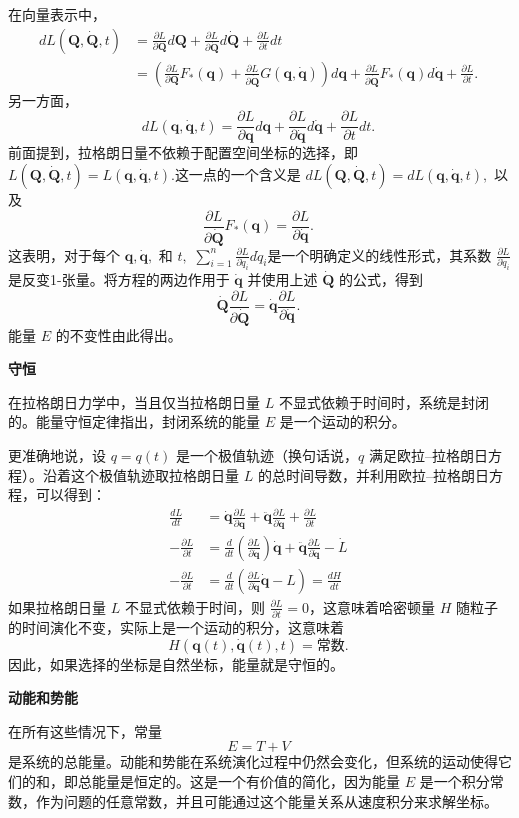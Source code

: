 在向量表示中，
\begin{equation}
\begin{aligned}
dL(\mathbf {Q}, {\dot {\mathbf {Q}}}, t) &= \frac{\partial L}{\partial \mathbf {Q}} d\mathbf {Q} + \frac{\partial L}{\partial {\dot {\mathbf {Q}}}} d{\dot {\mathbf {Q}}} + \frac{\partial L}{\partial t} dt\\
&= \left(\frac{\partial L}{\partial \mathbf {Q}} F_{*}(\mathbf {q}) + \frac{\partial L}{\partial {\dot {\mathbf {Q}}}} G(\mathbf {q}, {\dot {\mathbf {q}}})\right) d\mathbf {q} + \frac{\partial L}{\partial {\dot {\mathbf {Q}}}} F_{*}(\mathbf {q}) d{\dot {\mathbf {q}}} + \frac{\partial L}{\partial t}.
\end{aligned}~
\end{equation}
另一方面，
\[
dL(\mathbf {q}, {\dot {\mathbf {q}}}, t) = \frac{\partial L}{\partial \mathbf {q}} d\mathbf {q} + \frac{\partial L}{\partial {\dot {\mathbf {q}}}} d{\dot {\mathbf {q}}} + \frac{\partial L}{\partial t} dt.~
\]
前面提到，拉格朗日量不依赖于配置空间坐标的选择，即 \(L(\mathbf{Q}, \dot{\mathbf{Q}}, t) = L(\mathbf{q}, \dot{\mathbf{q}}, t).\)这一点的一个含义是 \(dL(\mathbf{Q}, \dot{\mathbf{Q}}, t) = dL(\mathbf{q}, \dot{\mathbf{q}}, t),\)
以及 
\[
\frac{\partial L}{\partial \dot{\mathbf{Q}}} F_{*}(\mathbf{q}) = \frac{\partial L}{\partial \dot{\mathbf{q}}}.~
\]
这表明，对于每个 \( \mathbf{q}, \dot{\mathbf{q}}, \) 和 \( t, \) \(\sum_{i=1}^{n} \frac{\partial L}{\partial \dot{q}_{i}} d\dot{q}_{i}\)是一个明确定义的线性形式，其系数 \(\frac{\partial L}{\partial \dot{q}_{i}}\)是反变1-张量。将方程的两边作用于 \( \dot{\mathbf{q}} \) 并使用上述 \( \dot{\mathbf{Q}} \) 的公式，得到 
\[
\dot{\mathbf{Q}} \frac{\partial L}{\partial \dot{\mathbf{Q}}} = \dot{\mathbf{q}} \frac{\partial L}{\partial \dot{\mathbf{q}}}.~
\] 
能量 \( E \) 的不变性由此得出。

\textbf{守恒}

在拉格朗日力学中，当且仅当拉格朗日量 \( L \) 不显式依赖于时间时，系统是封闭的。能量守恒定律指出，封闭系统的能量 \( E \) 是一个运动的积分。

更准确地说，设 \( q = q(t) \) 是一个极值轨迹（换句话说，\( q \) 满足欧拉–拉格朗日方程）。沿着这个极值轨迹取拉格朗日量 \( L \) 的总时间导数，并利用欧拉–拉格朗日方程，可以得到：
\[
\begin{aligned}
\frac{dL}{dt} &= \dot{\mathbf{q}} \frac{\partial L}{\partial \mathbf{q}} + \ddot{\mathbf{q}} \frac{\partial L}{\partial \dot{\mathbf{q}}} + \frac{\partial L}{\partial t} \\
- \frac{\partial L}{\partial t} &= \frac{d}{dt}\left(\frac{\partial L}{\partial \dot{\mathbf{q}}}\right) \dot{\mathbf{q}} + \ddot{\mathbf{q}} \frac{\partial L}{\partial \dot{\mathbf{q}}} - \dot{L} \\
- \frac{\partial L}{\partial t} &= \frac{d}{dt}\left(\frac{\partial L}{\partial \dot{\mathbf{q}}} \dot{\mathbf{q}} - L\right) = \frac{dH}{dt}
\end{aligned}~
\]
如果拉格朗日量 \( L \) 不显式依赖于时间，则 \( \frac{\partial L}{\partial t} = 0 \)，这意味着哈密顿量 \( H \) 随粒子的时间演化不变，实际上是一个运动的积分，这意味着 
\[
H(\mathbf{q}(t), \dot{\mathbf{q}}(t), t) = \text{常数}.~
\] 
因此，如果选择的坐标是自然坐标，能量就是守恒的。

\textbf{动能和势能}

在所有这些情况下，常量 
\[
E = T + V~
\] 
是系统的总能量。动能和势能在系统演化过程中仍然会变化，但系统的运动使得它们的和，即总能量是恒定的。这是一个有价值的简化，因为能量 \( E \) 是一个积分常数，作为问题的任意常数，并且可能通过这个能量关系从速度积分来求解坐标。